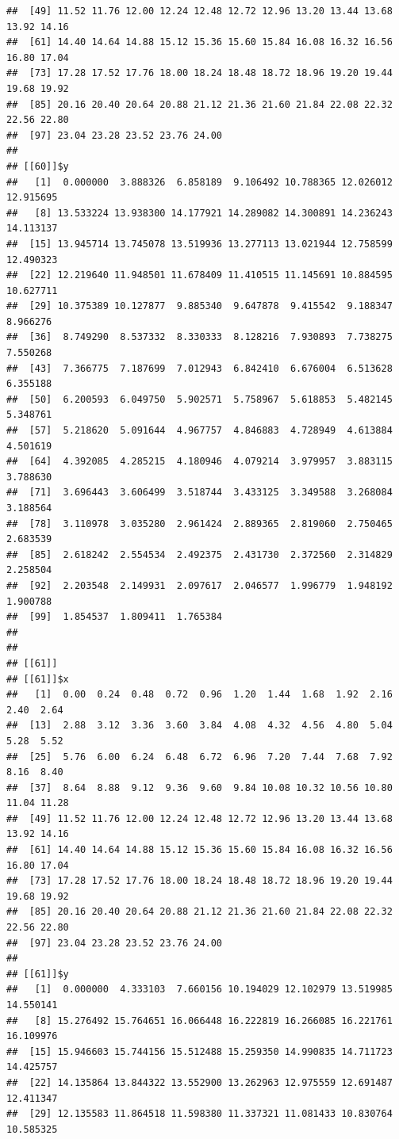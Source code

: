 \documentclass[
  ignorenonframetext,
]{beamer}
\begin{document}
\begin{frame}[fragile]{}
\begin{verbatim}
##  [49] 11.52 11.76 12.00 12.24 12.48 12.72 12.96 13.20 13.44 13.68 13.92 14.16
##  [61] 14.40 14.64 14.88 15.12 15.36 15.60 15.84 16.08 16.32 16.56 16.80 17.04
##  [73] 17.28 17.52 17.76 18.00 18.24 18.48 18.72 18.96 19.20 19.44 19.68 19.92
##  [85] 20.16 20.40 20.64 20.88 21.12 21.36 21.60 21.84 22.08 22.32 22.56 22.80
##  [97] 23.04 23.28 23.52 23.76 24.00
## 
## [[60]]$y
##   [1]  0.000000  3.888326  6.858189  9.106492 10.788365 12.026012 12.915695
##   [8] 13.533224 13.938300 14.177921 14.289082 14.300891 14.236243 14.113137
##  [15] 13.945714 13.745078 13.519936 13.277113 13.021944 12.758599 12.490323
##  [22] 12.219640 11.948501 11.678409 11.410515 11.145691 10.884595 10.627711
##  [29] 10.375389 10.127877  9.885340  9.647878  9.415542  9.188347  8.966276
##  [36]  8.749290  8.537332  8.330333  8.128216  7.930893  7.738275  7.550268
##  [43]  7.366775  7.187699  7.012943  6.842410  6.676004  6.513628  6.355188
##  [50]  6.200593  6.049750  5.902571  5.758967  5.618853  5.482145  5.348761
##  [57]  5.218620  5.091644  4.967757  4.846883  4.728949  4.613884  4.501619
##  [64]  4.392085  4.285215  4.180946  4.079214  3.979957  3.883115  3.788630
##  [71]  3.696443  3.606499  3.518744  3.433125  3.349588  3.268084  3.188564
##  [78]  3.110978  3.035280  2.961424  2.889365  2.819060  2.750465  2.683539
##  [85]  2.618242  2.554534  2.492375  2.431730  2.372560  2.314829  2.258504
##  [92]  2.203548  2.149931  2.097617  2.046577  1.996779  1.948192  1.900788
##  [99]  1.854537  1.809411  1.765384
## 
## 
## [[61]]
## [[61]]$x
##   [1]  0.00  0.24  0.48  0.72  0.96  1.20  1.44  1.68  1.92  2.16  2.40  2.64
##  [13]  2.88  3.12  3.36  3.60  3.84  4.08  4.32  4.56  4.80  5.04  5.28  5.52
##  [25]  5.76  6.00  6.24  6.48  6.72  6.96  7.20  7.44  7.68  7.92  8.16  8.40
##  [37]  8.64  8.88  9.12  9.36  9.60  9.84 10.08 10.32 10.56 10.80 11.04 11.28
##  [49] 11.52 11.76 12.00 12.24 12.48 12.72 12.96 13.20 13.44 13.68 13.92 14.16
##  [61] 14.40 14.64 14.88 15.12 15.36 15.60 15.84 16.08 16.32 16.56 16.80 17.04
##  [73] 17.28 17.52 17.76 18.00 18.24 18.48 18.72 18.96 19.20 19.44 19.68 19.92
##  [85] 20.16 20.40 20.64 20.88 21.12 21.36 21.60 21.84 22.08 22.32 22.56 22.80
##  [97] 23.04 23.28 23.52 23.76 24.00
## 
## [[61]]$y
##   [1]  0.000000  4.333103  7.660156 10.194029 12.102979 13.519985 14.550141
##   [8] 15.276492 15.764651 16.066448 16.222819 16.266085 16.221761 16.109976
##  [15] 15.946603 15.744156 15.512488 15.259350 14.990835 14.711723 14.425757
##  [22] 14.135864 13.844322 13.552900 13.262963 12.975559 12.691487 12.411347
##  [29] 12.135583 11.864518 11.598380 11.337321 11.081433 10.830764 10.585325

\end{verbatim}
\end{frame}
\end{document}
